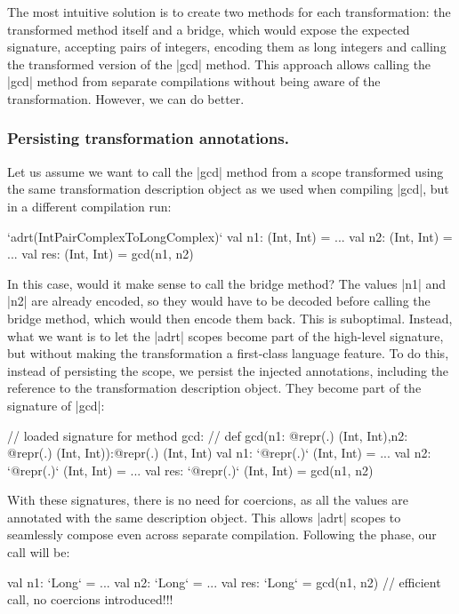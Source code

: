 The most intuitive solution is to create two methods for each transformation: the transformed method itself and a bridge, which would expose the expected signature, accepting pairs of integers, encoding them as long integers and calling the transformed version of the |gcd| method. This approach allows calling the |gcd| method from separate compilations without being aware of the transformation. However, we can do better.

\subsubsection{Persisting transformation annotations.} Let us assume we want to call the |gcd| method from a scope transformed using the same transformation description object as we used when compiling |gcd|, but in a different compilation run:

\begin{lstlisting-nobreak}
`adrt(IntPairComplexToLongComplex)` {
  val n1: (Int, Int) = ...
  val n2: (Int, Int) = ...
  val res: (Int, Int) = gcd(n1, n2)
}
\end{lstlisting-nobreak}

In this case, would it make sense to call the bridge method? The values |n1| and |n2| are already encoded, so they would have to be decoded before calling the bridge method, which would then encode them back. This is suboptimal. Instead, what we want is to let the |adrt| scopes become part of the high-level signature, but without making the transformation a first-class language feature. To do this, instead of persisting the scope, we persist the injected annotations, including the reference to the transformation description object. They become part of the signature of |gcd|:

\begin{lstlisting-nobreak}
// loaded signature for method gcd:
// def gcd(n1: @repr(.) (Int, Int),n2: @repr(.) (Int, Int)):@repr(.) (Int, Int)
val n1: `@repr(.)` (Int, Int) = ...
val n2: `@repr(.)` (Int, Int) = ...
val res: `@repr(.)` (Int, Int) = gcd(n1, n2)
\end{lstlisting-nobreak}

With these signatures, there is no need for coercions, as all the values are annotated with the same description object. This allows |adrt| scopes to seamlessly compose even across separate compilation. Following the \commit{} phase, our call will be:

\begin{lstlisting-nobreak}
val n1: `Long` = ...
val n2: `Long` = ...
val res: `Long` = gcd(n1, n2) // efficient call, no coercions introduced!!!
\end{lstlisting-nobreak}


